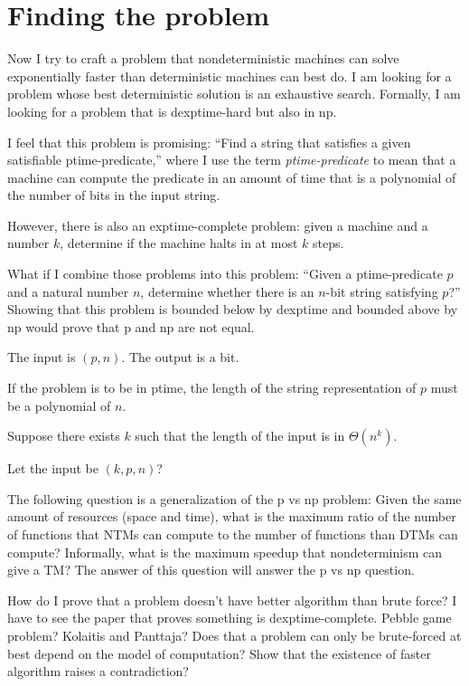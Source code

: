 \section{Finding the problem}

Now I try to craft a problem that nondeterministic machines
can solve exponentially faster than deterministic machines can best do.
I am looking for a problem whose best deterministic solution
is an exhaustive search.
Formally, I am looking for a problem that is dexptime-hard but also in np.

I feel that this problem is promising:
``Find a string that satisfies a given satisfiable ptime-predicate,''
where I use the term \emph{ptime-predicate} to mean that
a machine can compute the predicate in an amount of time
that is a polynomial of the number of bits in the input string.

However, there is also an exptime-complete problem:
given a machine and a number $k$, determine if the machine
halts in at most $k$ steps.

What if I combine those problems into this problem:
``Given a ptime-predicate $p$ and a natural number $n$,
determine whether there is an $n$-bit string satisfying $p$?''
Showing that this problem is bounded below by dexptime
and bounded above by np would prove that p and np are not equal.

The input is $(p,n)$.
The output is a bit.

If the problem is to be in ptime,
the length of the string representation of $p$
must be a polynomial of $n$.

Suppose there exists $k$ such that the length of the input is in $\Theta(n^k)$.

Let the input be $(k,p,n)$?

The following question is a generalization of the p vs np problem:
Given the same amount of resources (space and time),
what is the maximum ratio of the number of functions that NTMs can compute
to the number of functions than DTMs can compute?
Informally, what is the maximum speedup
that nondeterminism can give a TM?
The answer of this question will answer the p vs np question.

How do I prove that a problem doesn't have better algorithm than brute force?
I have to see the paper that proves something is dexptime-complete.
Pebble game problem? Kolaitis and Panttaja?
Does that a problem can only be brute-forced at best
depend on the model of computation?
Show that the existence of faster algorithm raises a contradiction?

